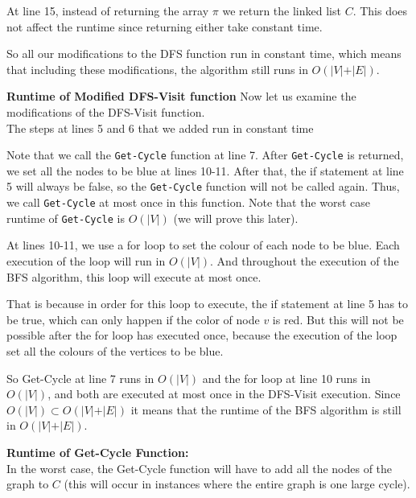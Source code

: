 \documentclass{article}
\begin{document}
At line 15, instead of returning the array $\pi$ we return the linked list $C$. This does not affect the runtime since returning either take constant time.

So all our modifications to the DFS function run in constant time, which means that including these modifications, the algorithm still runs in $O(\vert V\vert + \vert E\vert)$.

\textbf{Runtime of Modified DFS-Visit function}
Now let us examine the modifications of the DFS-Visit function.\\

The steps at lines 5 and 6 that we added run in constant time

Note that we call the \texttt{Get-Cycle} function at line 7. After \texttt{Get-Cycle} is returned, we set all the nodes to be blue at lines 10-11. After that, the if statement at line 5 will always be false, so the \texttt{Get-Cycle} function will not be called again. Thus, we call \texttt{Get-Cycle} at most once in this function. Note that the worst case runtime of \texttt{Get-Cycle} is $O(\vert V \vert)$ (we will prove this later).

At lines 10-11, we use a for loop to set the colour of each node to be blue. Each execution of the loop will run in $O(\vert V \vert)$.
And throughout the execution of the BFS algorithm, this loop will execute at most once.

That is because in order for this loop to execute, the if statement at line 5 has to be true, which can only happen if the color of node $v$ is red.
But this will not be possible after the for loop has executed once, because the execution of the loop set all the colours of the vertices to be blue.



So Get-Cycle at line 7 runs in $O(\vert V \vert)$ and the for loop at line 10 runs in $O(\vert V \vert)$, and both are executed at most once in the DFS-Visit execution.
Since $O(\vert V \vert) \subset O(\vert V\vert + \vert E\vert)$ it means that the runtime of the BFS algorithm is still in $O(\vert V\vert + \vert E\vert)$.

\textbf{Runtime of Get-Cycle Function:}\\
In the worst case, the Get-Cycle function will have to add all the nodes of the graph to $C$ (this will occur in instances where the entire graph is one large cycle).
\end{document}
